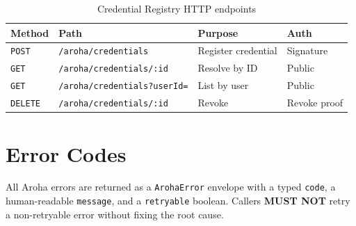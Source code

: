 \documentclass[11pt,a4paper]{article}
\begin{document}
\begin{table}[ht]
  \centering
  \renewcommand{\arraystretch}{1.3}
  \begin{tabularx}{\textwidth}{@{} l l X l @{}}
    \toprule
    \textbf{Method} & \textbf{Path} & \textbf{Purpose} & \textbf{Auth} \\
    \midrule
    \texttt{POST}   & \texttt{/aroha/credentials}         & Register credential & Signature \\
    \texttt{GET}    & \texttt{/aroha/credentials/:id}     & Resolve by ID       & Public \\
    \texttt{GET}    & \texttt{/aroha/credentials?userId=} & List by user        & Public \\
    \texttt{DELETE} & \texttt{/aroha/credentials/:id}     & Revoke              & Revoke proof \\
    \bottomrule
  \end{tabularx}
  \caption{Credential Registry HTTP endpoints}
\end{table}

\section{Error Codes}

All Aroha errors are returned as a \texttt{ArohaError} envelope with a typed
\texttt{code}, a human-readable \texttt{message}, and a \texttt{retryable} boolean.
Callers \textbf{MUST NOT} retry a non-retryable error without fixing the root cause.
\end{document}
